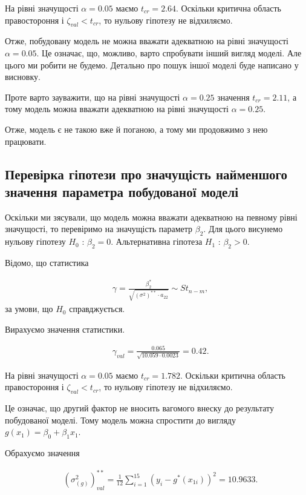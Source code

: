 \documentclass[14pt,a4paper]{scrartcl}
\theoremstyle{definition}
\theoremstyle{remark}
\theoremstyle{definition}
\theoremstyle{definition}
\begin{document}
На рівні значущості $\alpha = 0.05$ маємо $t_{cr} = 2.64$. Оскільки критична область правостороння і $\zeta_{val} < t_{cr}$, то нульову гіпотезу не відхиляємо.

Отже, побудовану модель не можна вважати адекватною на рівні значущості $\alpha = 0.05$. Це означає, що, можливо, варто спробувати інший вигляд моделі. Але цього ми робити не будемо. Детально про пошук іншої моделі буде написано у висновку.

Проте варто зауважити, що на рівні значущості $\alpha = 0.25$ значення $t_{cr} = 2.11$, а тому модель можна вважати адекватною на рівні значущості $\alpha = 0.25$.

Отже, модель є не такою вже й поганою, а тому ми продовжимо з нею працювати.

\subsection{Перевірка гіпотези про значущість найменшого значення параметра побудованої моделі}

Оскільки ми з\textquotesingle ясували, що модель можна вважати адекватною на певному рівні значущості, то перевіримо на значущість параметр $\beta_{2}$. Для цього висунемо нульову гіпотезу $H_{0}$ : $\beta_{2} = 0$. Альтернативна гіпотеза $H_{1}$ : $\beta_{2} > 0$.

Відомо, що статистика

\begin{align*}
  & \gamma = \frac{\beta_{2}^{*}}{\sqrt{(\sigma^2)^{**}\cdot a_{22}}} \sim St_{n - m},
\end{align*} за умови, що $H_{0}$ справджується.

Вирахуємо значення статистики.

\begin{align*}
  & \gamma_{val} = \frac{0.065}{\sqrt{10.059 \cdot 0.0023}} = 0.42.
\end{align*}

На рівні значущості $\alpha = 0.05$ маємо $t_{cr} = 1.782$. Оскільки критична область правостороння і $\zeta_{val} < t_{cr}$, то нульову гіпотезу не відхиляємо.

Це означає, що другий фактор не вносить вагомого внеску до результату побудованої моделі. Тому модель можна спростити до вигляду $g(x_{1}) = \beta_{0} + \beta_{1} x_{1}$.

Обрахуємо значення

\begin{align*}
  & (\sigma_{(g)}^2)^{**}_{val} = \frac{1}{12} \sum_{i = 1}^{15} (y_{i} - g^{*}(x_{1i}))^2 = 10.9633.
\end{align*}
\end{document}
